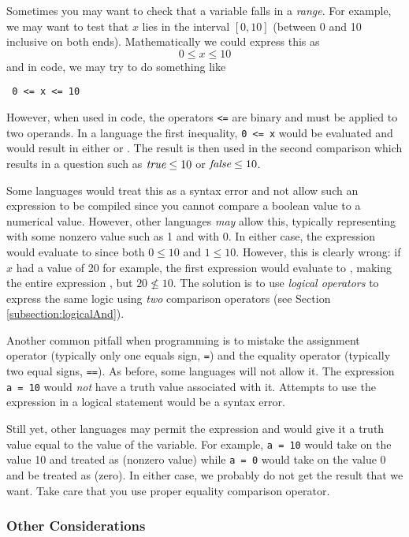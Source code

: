 Sometimes you may want to check that a variable falls in a \emph{range}.  For
example, we may want to test that $x$ lies in the interval $[0, 10]$ (between
0 and 10 inclusive on both ends).  Mathematically we could express this as
  $$0 \leq x \leq 10$$
and in code, we may try to do something like

\texttt{  0 <= x <= 10}

However, when used in code, the operators \texttt{<=} are binary and must be
applied to two operands.  In a language the first inequality, \texttt{0 <= x} 
would be evaluated and would result in either \True or \False.  The result is then
used in the second comparison which results in a question such as $\emph{true} \leq 10$
or $\emph{false} \leq 10$.

Some languages would treat this as a syntax error and not allow such an expression
to be compiled since you cannot compare a boolean value to a numerical value.
However, other languages \emph{may} allow this, typically representing \True
with some nonzero value such as 1 and \False with 0.  In either case, the
expression would evaluate to \True since both $0 \leq 10$ and $1 \leq 10$.  
However, this is clearly wrong: if $x$ had a value of 20 for example, the first
expression would evaluate to \False, making the entire expression \True, but
$20 \not\leq 10$.  The solution is to use \emph{logical operators} to express
the same logic using \emph{two} comparison operators (see Section \ref{subsection:logicalAnd}).

Another common pitfall when programming is to mistake the assignment 
operator (typically only one equals sign, \texttt{=}) and the equality operator
(typically two equal signs, \texttt{==}).  As before, some languages will not
allow it.  The expression \texttt{a = 10} would \emph{not} have a truth value
associated with it.  Attempts to use the expression in a logical statement would
be a syntax error.  

Still yet, other languages may permit the expression and would
give it a truth value equal to the value of the variable.  For example, \texttt{a = 10}
would take on the value 10 and treated as \True (nonzero value) while 
\texttt{a = 0} would take on the value 0 and be treated as \False (zero).
In either case, we probably do not get the result that we want.  Take care that you
use proper equality comparison operator.  

\subsubsection{Other Considerations}

